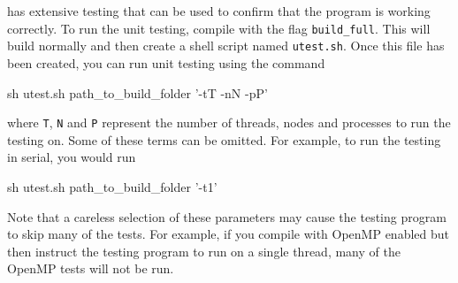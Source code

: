 \escript has extensive testing that can be used to confirm that the program is working correctly. To run the unit testing, compile \escript with the flag \texttt{build_full}. This will build \escript normally and then create a shell script named \texttt{utest.sh}. Once this file has been created, you can run unit testing using the command
\begin{shellCode}
sh utest.sh path_to_build_folder '-tT -nN -pP'
\end{shellCode}
where \texttt{T}, \texttt{N} and \texttt{P} represent the number of threads, nodes and processes to run the testing on. Some of these terms can be omitted. For example, to run the testing in serial, you would run
\begin{shellCode}
sh utest.sh path_to_build_folder '-t1'
\end{shellCode}

Note that a careless selection of these parameters may cause the testing program to skip many of the tests. For example, if you compile \escript with OpenMP enabled but then instruct the testing program to run on a single thread, many of the OpenMP tests will not be run.